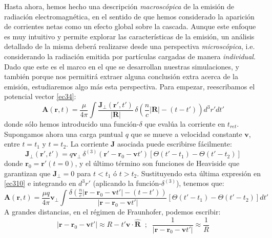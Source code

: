 \documentclass[12 pt, a4paper]{article} %
\numberwithin{equation}{section}
\numberwithin{figure}{section}
\newcommand{\vect}[1]{\boldsymbol{\mathbf{#1}}}
\begin{document}
Hasta ahora, hemos hecho una descripción \textit{macroscópica} de la emisión de radiación electromagnética, en el sentido de que hemos considerado la aparición de corrientes netas como un efecto global sobre la cascada. Aunque este enfoque es muy intuitivo y permite explorar las características de la emisión, un análisis detallado de la misma deberá realizarse desde una perspectiva \textit{microscópica}, i.e. considerando la radiación emitida por partículas cargadas de manera \textit{individual}. Dado que este es el marco en el que se desarrollan nuestras simulaciones, y también porque nos permitirá extraer alguna conclusión extra acerca de la emisión, estudiaremos algo más esta perspectiva. Para empezar, reescribamos el potencial vector \eqref{ec34}:
\begin{equation}
	\vect{A}\left(\vect{r}, t\right)=\frac{\mu}{4\pi}\int \frac{\vect{J}_\perp\left(\vect{r}', t'\right)}{\left|\vect{R}\right|}\,\delta\left(\frac{n}{c}\left|\vect{R}\right|-\left(t-t'\right)\right)d^3r'dt'\label{ec310}
\end{equation} 
donde sólo hemos introducido una función-$\delta$ que evalúa la corriente en $t_{ret}$. Supongamos ahora una carga puntual $q$ que se mueve a velocidad constante $\vect{v}$, entre $t=t_1$ y $t=t_2$. La corriente $\vect{J}$ asociada puede escribirse fácilmente:
\begin{equation}
	\vect{J}_\perp\left(\vect{r'}, t'\right)=q\vect{v}_\perp \,\delta^{(3)}\left(\vect{r}'-\vect{r}_0-\vect{v}t'\right)\left[\Theta\left(t'-t_1\right)-\Theta\left(t'-t_2\right)\right]\label{ec311}
\end{equation}
donde $\vect{r}_0=\vect{r}'\left(t=0\right)$, y el último término son funciones de Heaviside que garantizan que $\vect{J}_\perp=0$ para $t<t_1$ ó $t>t_2$. Sustituyendo esta última expresión en \eqref{ec310} e integrando en $d^3r'$ (aplicando la función-$\delta^{(3)}$), tenemos que:
\begin{equation}
	\vect{A}\left(\vect{r}, t\right)=\frac{\mu q}{4\pi}\vect{v}_\perp\int \frac{\delta\left(\frac{n}{c} \left|\vect{r}-\vect{r}_0-\vect{v}t'\right|-\left(t-t'\right)\right)}{\left|\vect{r}-\vect{r}_0-\vect{v}t'\right|}\left[\Theta\left(t'-t_1\right)-\Theta\left(t'-t_2\right)\right]dt'\label{ec312}
\end{equation}
A grandes distancias, en el régimen de Fraunhofer, podemos escribir:
\begin{equation}
	\left|\vect{r}-\vect{r}_0-\vect{v}t'\right|\approx R-t'\vect{v}\cdot\hat{\vect{R}}\;\;;\;\;\frac{1}{\left|\vect{r}-\vect{r}_0-\vect{v}t'\right|} \approx \frac{1}{R}\label{ec313}
\end{equation}
\end{document}
